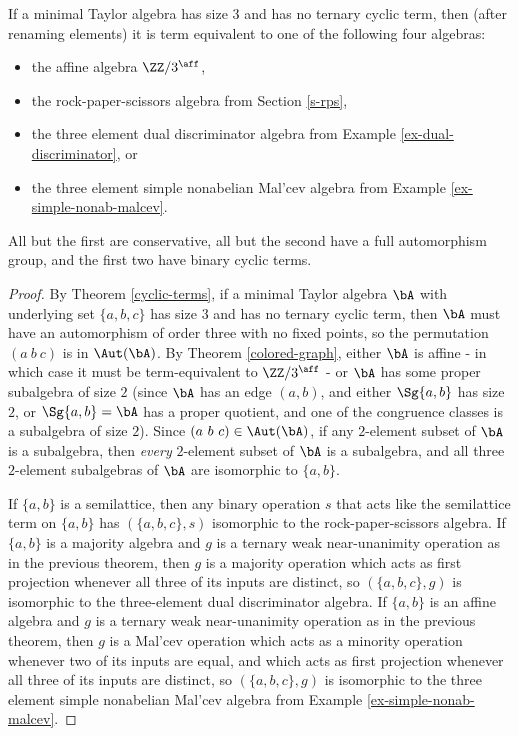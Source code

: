 \begin{thm}\label{thm-minimal-no-cyclic} If a minimal Taylor algebra has size $3$ and has no ternary cyclic term, then (after renaming elements) it is term equivalent to one of the following four algebras:
\begin{itemize}
\item the affine algebra $\ZZ/3^{\aff}$,
\item the rock-paper-scissors algebra from Section \ref{s-rps},
\item the three element dual discriminator algebra from Example \ref{ex-dual-discriminator}, or
\item the three element simple nonabelian Mal'cev algebra from Example \ref{ex-simple-nonab-malcev}.
\end{itemize}
All but the first are conservative, all but the second have a full automorphism group, and the first two have binary cyclic terms.
\end{thm}
\begin{proof} By Theorem \ref{cyclic-terms}, if a minimal Taylor algebra $\bA$ with underlying set $\{a,b,c\}$ has size $3$ and has no ternary cyclic term, then $\bA$ must have an automorphism of order three with no fixed points, so the permutation $(a\ b\ c)$ is in $\Aut(\bA)$. By Theorem \ref{colored-graph}, either $\bA$ is affine - in which case it must be term-equivalent to $\ZZ/3^{\aff}$ - or $\bA$ has some proper subalgebra of size $2$ (since $\bA$ has an edge $(a,b)$, and either $\Sg\{a,b\}$ has size $2$, or $\Sg\{a,b\} = \bA$ has a proper quotient, and one of the congruence classes is a subalgebra of size $2$). Since $(a\ b\ c) \in \Aut(\bA)$, if any $2$-element subset of $\bA$ is a subalgebra, then \emph{every} $2$-element subset of $\bA$ is a subalgebra, and all three $2$-element subalgebras of $\bA$ are isomorphic to $\{a,b\}$.

If $\{a,b\}$ is a semilattice, then any binary operation $s$ that acts like the semilattice term on $\{a,b\}$ has $(\{a,b,c\},s)$ isomorphic to the rock-paper-scissors algebra. If $\{a,b\}$ is a majority algebra and $g$ is a ternary weak near-unanimity operation as in the previous theorem, then $g$ is a majority operation which acts as first projection whenever all three of its inputs are distinct, so $(\{a,b,c\},g)$ is isomorphic to the three-element dual discriminator algebra. If $\{a,b\}$ is an affine algebra and $g$ is a ternary weak near-unanimity operation as in the previous theorem, then $g$ is a Mal'cev operation which acts as a minority operation whenever two of its inputs are equal, and which acts as first projection whenever all three of its inputs are distinct, so $(\{a,b,c\},g)$ is isomorphic to the three element simple nonabelian Mal'cev algebra from Example \ref{ex-simple-nonab-malcev}.
\end{proof}

